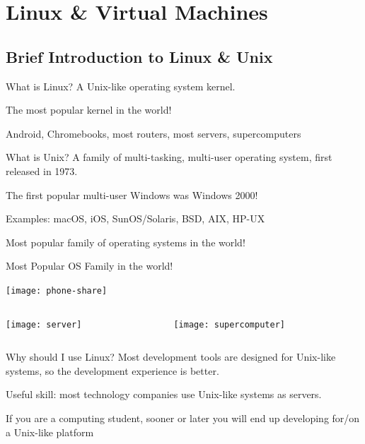 \documentclass[12pt]{beamer}
\begin{document}
\section{Linux \& Virtual Machines}
\subsection{Brief Introduction to Linux \& Unix}

\begin{frame}{What is Linux?}
  A Unix-like operating system kernel.

  The most popular kernel in the world!

  Android, Chromebooks, most routers, most servers, supercomputers
\end{frame}

\begin{frame}{What is Unix?}
  A family of multi-tasking, multi-user operating system, first released in 1973.

  The first popular multi-user Windows was Windows 2000!

  Examples: macOS, iOS, SunOS/Solaris, BSD, AIX, HP-UX

  Most popular family of operating systems in the world!
\end{frame}

\begin{frame}{Most Popular OS Family in the world!}
  \begin{center}
    \texttt{[image: phone-share]}
  \end{center}

  \begin{columns}
    \begin{column}{0.5\linewidth}
      \texttt{[image: server]}
    \end{column}
    \begin{column}{0.5\linewidth}
      \texttt{[image: supercomputer]}
    \end{column}
  \end{columns}
\end{frame}

\begin{frame}{Why should I use Linux?}
  Most development tools are designed for Unix-like systems, so the development experience is better.

  Useful skill: most technology companies use Unix-like systems as servers.

  If you are a computing student, sooner or later you will end up developing for/on a Unix-like platform
\end{frame}
\end{document}

